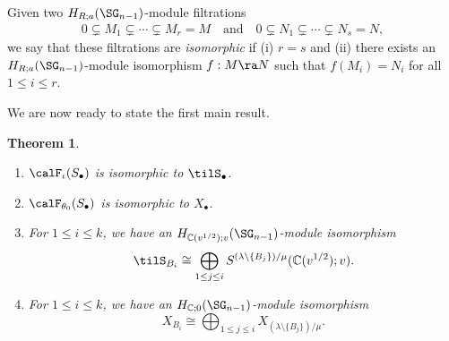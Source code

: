 \documentclass[12pt, reqno]{amsart}
\theoremstyle{plain}
\newtheorem{theorem}{Theorem}[section]
\theoremstyle{definition}
\numberwithin{equation}{section}
\numberwithin{figure}{section}
\numberwithin{table}{section}
\def\C{\mathbb C}
\begin{document}
Given two $H_{R;a}(\SG_{n-1})$-module filtrations 
\begin{align*}
0 \subsetneq M_1 \subsetneq \cdots 
\subsetneq M_r = M 
\quad\text{and}\quad 
0  \subsetneq N_1 \subsetneq \cdots 
\subsetneq N_s = N,    
\end{align*}
we say that 
these filtrations are  \emph{isomorphic} if 
(i) $r = s$ and (ii) there exists an $H_{R;a}(\SG_{n-1})$-module isomorphism $f: M \ra N$ such that $f(M_i) = N_i$ for all $1 \leq i \leq r$.

We are now ready to state the first main result. 
\begin{theorem}\label{thm: skew Specht poly rest and specialization}
\begin{enumerate}[label = {\rm (\arabic*)}]
\item $\calF_{\iota}(S_{\bullet})$ is isomorphic to $\tilS_{\bullet}$.
\item $\calF_{\theta_0}(S_{\bullet})$ is isomorphic to $X_{\bullet}$.
\item For $1 \leq i \leq k$, we have an $H_{\C(v^{1/2});v}(\SG_{n-1})$-module isomorphism
\[ 
\tilS_{B_i} \cong \bigoplus_{1\le j \le i}
S^{(\lambda \setminus \{B_j\})/\mu}(\C(v^{1/2});v).
\]


\item For $1 \leq i \leq k$, we have an $H_{\C;0}(\SG_{n-1})$-module isomorphism
\[
X_{B_i} \cong 
\bigoplus_{1 \le j \le i}
X_{(\lambda\setminus\{B_j\})/\mu}.
\]
\end{enumerate}
\end{theorem}
\end{document}
